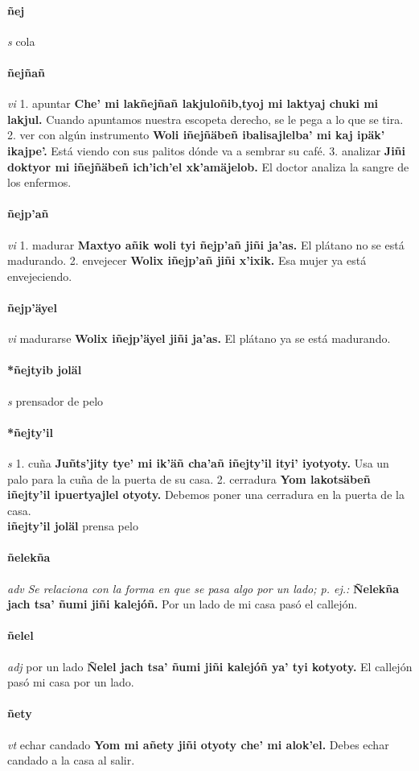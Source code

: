 \documentclass{scrbook}
\newcommand{\entry}[1]{\paragraph{#1}}
\newcommand{\onedefinition}[1]{#1.}
\newcommand{\nontranslationdef}[1]{\textit{#1}}
\newcommand{\partofspeech}[1]{\textit{#1}}
\newcommand{\spanishtranslation}[1]{#1}
\newcommand{\cholexample}[1]{\textbf{#1}}
\newcommand{\exampletranslation}[1]{#1}
\newcommand{\secondaryentry}[1]{\\\textbf{#1}}
\newcommand{\secondtranslation}[1]{#1}
\begin{document}
\begin{multicols}{2}
\entry{ñej}
\partofspeech{s}
\spanishtranslation{cola}

\entry{ñejñañ}
\partofspeech{vi}
\onedefinition{1}
\spanishtranslation{apuntar}
\cholexample{Che' mi lakñejñañ lakjuloñib,tyoj mi laktyaj chuki mi lakjul.}
\exampletranslation{Cuando apuntamos nuestra escopeta derecho, se le pega a lo que se tira.}
\onedefinition{2}
\spanishtranslation{ver con algún instrumento}
\cholexample{Woli iñejñäbeñ ibalisajlelba' mi kaj ipäk' ikajpe'.}
\exampletranslation{Está viendo con sus palitos dónde va a sembrar su café.}
\onedefinition{3}
\spanishtranslation{analizar}
\cholexample{Jiñi doktyor mi iñejñäbeñ ich'ich'el xk'amäjelob.}
\exampletranslation{El doctor analiza la sangre de los enfermos.}

\entry{ñejp'añ}
\partofspeech{vi}
\onedefinition{1}
\spanishtranslation{madurar}
\cholexample{Maxtyo añik woli tyi ñejp'añ jiñi ja'as.}
\exampletranslation{El plátano no se está madurando.}
\onedefinition{2}
\spanishtranslation{envejecer}
\cholexample{Wolix iñejp'añ jiñi x'ixik.}
\exampletranslation{Esa mujer ya está envejeciendo.}

\entry{ñejp'äyel}
\partofspeech{vi}
\spanishtranslation{madurarse}
\cholexample{Wolix iñejp'äyel jiñi ja'as.}
\exampletranslation{El plátano ya se está madurando.}

\entry{*ñejtyib joläl}
\partofspeech{s}
\spanishtranslation{prensador de pelo}

\entry{*ñejty'il}
\partofspeech{s}
\onedefinition{1}
\spanishtranslation{cuña}
\cholexample{Juñts'jity tye' mi ik'äñ cha'añ iñejty'il ityi' iyotyoty.}
\exampletranslation{Usa un palo para la cuña de la puerta de su casa.}
\onedefinition{2}
\spanishtranslation{cerradura}
\cholexample{Yom lakotsäbeñ iñejty'il ipuertyajlel otyoty.}
\exampletranslation{Debemos poner una cerradura en la puerta de la casa.}
\secondaryentry{iñejty'il joläl}
\secondtranslation{prensa pelo}

\entry{ñelekña}
\partofspeech{adv}
\nontranslationdef{Se relaciona con la forma en que se pasa algo por un lado; p. ej.:}
\cholexample{Ñelekña jach tsa' ñumi jiñi kalejóñ.}
\exampletranslation{Por un lado de mi casa pasó el callejón.}

\entry{ñelel}
\partofspeech{adj}
\spanishtranslation{por un lado}
\cholexample{Ñelel jach tsa' ñumi jiñi kalejóñ ya' tyi kotyoty.}
\exampletranslation{El callejón pasó mi casa por un lado.}

\entry{ñety}
\partofspeech{vt}
\spanishtranslation{echar candado}
\cholexample{Yom mi añety jiñi otyoty che' mi alok'el.}
\exampletranslation{Debes echar candado a la casa al salir.}


\end{multicols}
\end{document}
